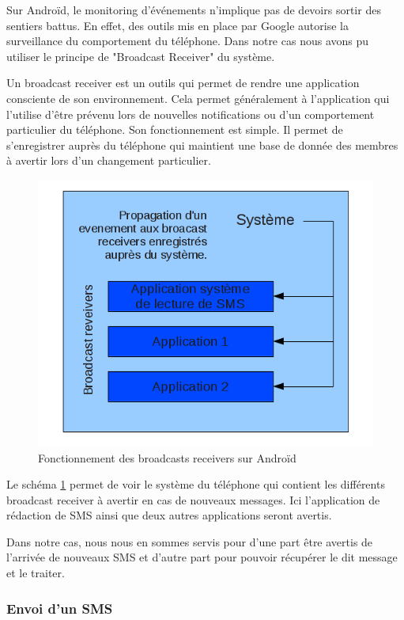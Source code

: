 Sur Androïd, le monitoring d’événements n'implique pas de devoirs sortir des sentiers battus. En effet,
des outils mis en place par Google autorise la surveillance du comportement du téléphone. Dans notre cas 
nous avons pu utiliser le principe de "Broadcast Receiver" du système. 

Un broadcast receiver est un outils qui permet de rendre une application consciente de son environnement.
Cela permet généralement à l'application qui l'utilise d’être prévenu lors de nouvelles notifications ou 
d'un comportement particulier du téléphone.
Son fonctionnement est simple. Il permet de s'enregistrer auprès du téléphone qui maintient une base de donnée des 
membres à avertir lors d'un changement particulier.

\begin{figure}[!h]
	\center
	\includegraphics[width=12cm]{img/broadcast-receivers.png}
	\caption{Fonctionnement des broadcasts receivers sur Androïd}
	\label{broadcast-receivers}
\end{figure}

Le schéma \ref{broadcast-receivers} permet de voir le système du téléphone qui contient les différents broadcast receiver à avertir en cas de nouveaux messages. Ici l'application de rédaction de SMS ainsi que deux autres 
applications seront avertis.

Dans notre cas, nous nous en sommes servis pour d'une part être avertis de l'arrivée de nouveaux SMS et d'autre part pour pouvoir récupérer le dit message et le traiter.
\\


\subsubsection{Envoi d'un SMS}


